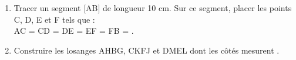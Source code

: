 \begin{exercice*} %
   \begin{enumerate}
      \item Tracer un segment [AB] de longueur 10 cm. Sur ce segment, placer les points C, D, E et F tels que : \\
      AC = CD = DE = EF = FB = .
      \item Construire les losanges AHBG, CKFJ et DMEL dont les côtés mesurent .
   \end{enumerate}
\end{exercice*}
